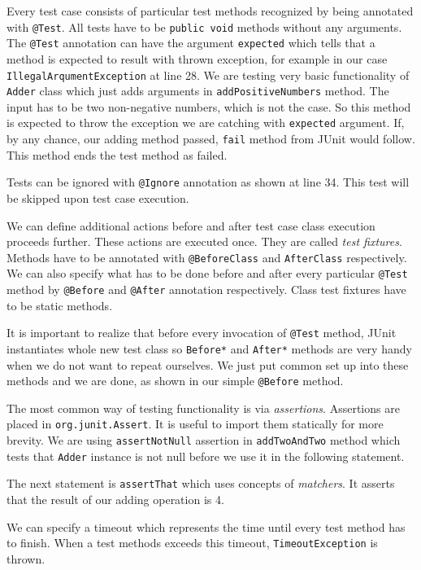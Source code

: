 \documentclass[12pt,final,oneside]{fithesis}
\begin{document}
Every test case consists of particular test methods recognized by being annotated with \texttt{@Test}. All tests have to be \texttt{public void} methods without any arguments. The \texttt{@Test} annotation can have the argument \texttt{expected} which tells that a method is expected to result with thrown exception, for example in our case \texttt{IllegalArqumentException} at line 28. We are testing very basic functionality of \texttt{Adder} class which just adds arguments in \texttt{addPositiveNumbers} method. The input has to be two non-negative numbers, which is not the case. So this method is expected to throw the exception we are catching with \texttt{expected} argument. If, by any chance, our adding method passed, \texttt{fail} method from JUnit would follow. This method ends the test method as failed.

Tests can be ignored with \texttt{@Ignore} annotation as shown at line 34. This test will be skipped upon test case execution.

We can define additional actions before and after test case class execution proceeds further. These actions are executed once. They are called \textit{test fixtures}. Methods have to be annotated with \texttt{@BeforeClass} and \texttt{AfterClass} respectively. We can also specify what has to be done before and after every particular \texttt{@Test} method by \texttt{@Before} and \texttt{@After} annotation respectively. Class test fixtures have to be static methods.

It is important to realize that before every invocation of \texttt{@Test} method, JUnit instantiates whole new test class so \texttt{Before*} and \texttt{After*} methods are very handy when we do not want to repeat ourselves. We just put common set up into these methods and we are done, as shown in our simple \texttt{@Before} method.

The most common way of testing functionality is via \textit{assertions}. Assertions are placed in \texttt{org.junit.Assert}. It is useful to import them statically for more brevity. We are using \texttt{assertNotNull} assertion in \texttt{addTwoAndTwo} method which tests that \texttt{Adder} instance is not null before we use it in the following statement.

The next statement is \texttt{assertThat} which uses concepts of \textit{matchers}. It asserts that the result of our adding operation is 4.

We can specify a timeout which represents the time until every test method has to finish. When a test methods exceeds this timeout, \texttt{TimeoutException} is thrown.
\end{document}
